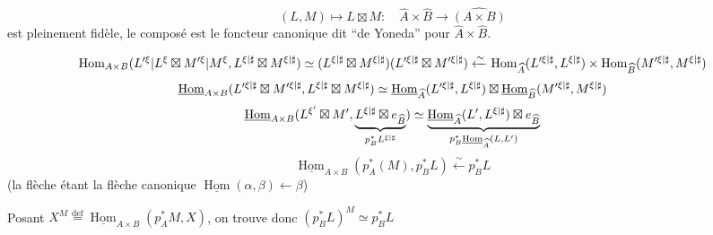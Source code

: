 \[
(L,M)\longmapsto L\boxtimes M:\quad
\widehat A\times\widehat B\longrightarrow\widehat{(A\times B)}
\]
est pleinement fidèle,
le composé est le foncteur canonique dit ``de Yoneda'' pour
$\widehat A\times\widehat B$.

\[
\operatorname{Hom}_{A\times B}
({L'^{\xi}|L^{\xi}}\boxtimes{M'^{\xi}|M^{\xi}},
L^{{\xi|\sharp}}\boxtimes M^{{\xi|\sharp}})
\simeq
(L^{{\xi|\sharp}}\boxtimes M^{{\xi|\sharp}})
(L'^{{\xi|\sharp}}\boxtimes M'^{{\xi|\sharp}})
\xleftarrow{\sim}
\operatorname{Hom}_{\widehat A}(L'^{{\xi|\sharp}},L^{{\xi|\sharp}})
\times\operatorname{Hom}_{\widehat B}(M'^{{\xi|\sharp}},M^{{\xi|\sharp}})
\]
\[
\underline{\operatorname{Hom}}_{A\times B}
(L'^{{\xi|\sharp}}\boxtimes M'^{{\xi|\sharp}},L^{{\xi|\sharp}}\boxtimes M^{{\xi|\sharp}})
\simeq\underline{\operatorname{Hom}}_{\widehat A}(L'^{{\xi|\sharp}},L^{{\xi|\sharp}})
\boxtimes\underline{\operatorname{Hom}}_{\widehat B}(M'^{{\xi|\sharp}},M^{{\xi|\sharp}})
\]
\[
\underline{\operatorname{Hom}}_{A\times B}
(L^{{\xi'}}\boxtimes M',
\underbrace{L^{{\xi|\sharp}}\boxtimes e_{\widehat B}}_{p_B^*L^{{\xi|\sharp}}})
\simeq
\underbrace{\underline{\operatorname{Hom}}_{\widehat A}(L',L^{{\xi|\sharp}})\boxtimes e_{\widehat B}}_{p_B^*\underline{\operatorname{Hom}}_{\widehat A}(L,L')}
\]
\[
\underline{\operatorname{Hom}}_{A\times B}(p_A^*(M),p_B^*L)
\xleftarrow{\sim}p_B^*L
\]
(la flèche étant la flèche canonique
$\underline{\operatorname{Hom}}(\alpha,\beta)\longleftarrow\beta$)

Posant $X^M\overset{\mathrm{def}}=\underline{\operatorname{Hom}}_{A\times B}(p_A^*M,X)$,
on trouve donc $(p_B^*L)^M\simeq p_B^*L$

